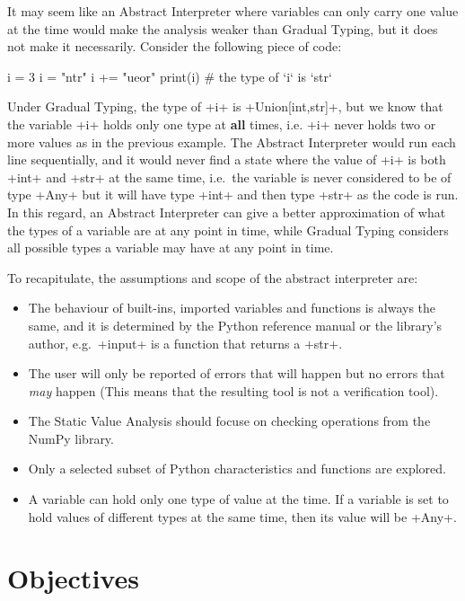 It may seem like an Abstract Interpreter where variables can only carry one value at the
time would make the analysis weaker than Gradual Typing, but it does not make it necessarily.
Consider the following piece of code:

\begin{pythoncode}
i = 3
i = "ntr"
i += "ueor"
print(i)  # the type of `i` is `str`
\end{pythoncode}

Under Gradual Typing, the type of \pycode+i+ is \pycode+Union[int,str]+, but we know that
the variable \pycode+i+ holds only one type at \textbf{all} times, i.e. \pycode+i+ never
holds two or more values as in the previous example. The Abstract Interpreter would run
each line sequentially, and it would never find a state where the value of \pycode+i+ is
both \pycode+int+ and \pycode+str+ at the same time, i.e.~the variable is never considered
to be of type \pycode+Any+ but it will have type \pycode+int+ and then type \pycode+str+
as the code is run. In this regard, an Abstract Interpreter can give a better
approximation of what the types of a variable are at any point in time, while Gradual
Typing considers all possible types a variable may have at any point in time.

To recapitulate, the assumptions and scope of the abstract interpreter are:

\begin{itemize}
\tightlist
\item The behaviour of built-ins, imported variables and functions is always the same,
  and it is determined by the Python reference manual or the library's author,
  e.g.~\pycode+input+ is a function that returns a \pycode+str+.
\item The user will only be reported of errors that will happen but no errors that
  \emph{may} happen (This means that the resulting tool is not a verification tool).
\item The Static Value Analysis should focuse on checking operations from the NumPy library.
\item Only a selected subset of Python characteristics and functions are explored.
\item A variable can hold only one type of value at the time. If a variable is set to hold
  values of different types at the same time, then its value will be \pycode+Any+.
\end{itemize}

\section{Objectives}\label{objectives}


